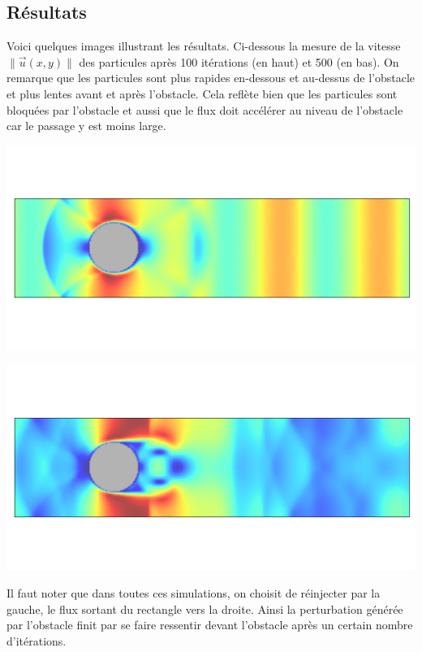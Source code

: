 \documentclass[11pt,class=report,crop=false]{standalone}
\begin{document}
	
\subsection{Résultats}

Voici quelques images illustrant les résultats. 
Ci-dessous la mesure de la vitesse $\| \vec{u}(x,y) \|$ des particules après 100 itérations (en haut) et 500 (en bas).
On remarque que les particules sont plus rapides en-dessous et au-dessus de l'obstacle et plus lentes avant et après l'obstacle. Cela reflète bien que les particules sont bloquées par l'obstacle et aussi que le flux doit accélérer au niveau de l'obstacle car le passage y est moins large.
\begin{center}
	\includegraphics[scale=\myscale,scale=0.5,trim={0 3cm 0 3cm},clip]{figures/fluide-vitesse-100}
	
	\includegraphics[scale=\myscale,scale=0.5,trim={0 3cm 0 3cm},clip]{figures/fluide-vitesse-500}			
\end{center}

Il faut noter que dans toutes ces simulations, on choisit de réinjecter par la gauche, le flux sortant du rectangle vers la droite. Ainsi la perturbation générée par l'obstacle finit par se faire ressentir devant l'obstacle après un certain nombre d'itérations.
\end{document}
